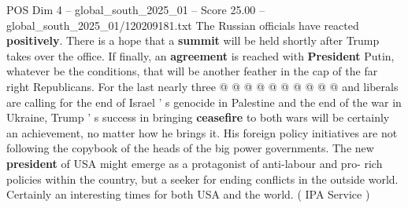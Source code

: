 \begin{textsample}{POS Dim 4 – global\_south\_2025\_01 – Score 25.00 – global\_south\_2025\_01/120209181.txt}
The Russian officials have reacted \textbf{positively}.
There is a hope that a \textbf{summit} will be held shortly after Trump takes over the office.
If finally, an \textbf{agreement} is reached with \textbf{President} Putin, whatever be the conditions, that will be another feather in the cap of the far right Republicans.
For the last nearly three @ @ @ @ @ @ @ @ @ @ and liberals are calling for the end of Israel ' s genocide in Palestine and the end of the war in Ukraine, Trump ' s success in bringing \textbf{ceasefire} to both wars will be certainly an achievement, no matter how he brings it.
His foreign policy initiatives are not following the copybook of the heads of the big power governments.
The new \textbf{president} of USA might emerge as a protagonist of anti-labour and pro- rich policies within the country, but a seeker for ending conflicts in the outside world.
Certainly an interesting times for both USA and the world. ( IPA Service )

\end{textsample}
